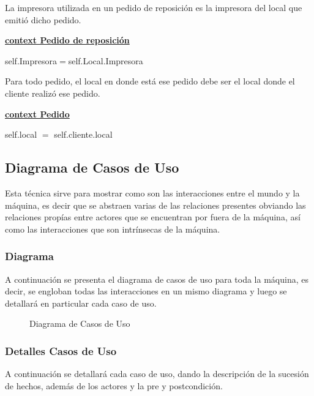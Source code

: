 \documentclass[a4paper,10pt]{article}
\begin{document}
\noindent La impresora utilizada en un pedido de reposición es la impresora del local que emitió dicho pedido.

\medskip

\underline{\textbf{context Pedido de reposición}}

self.Impresora$=$self.Local.Impresora

\bigskip

\noindent Para todo pedido, el local en donde est\'a ese pedido debe ser el local donde el cliente realiz\'o ese pedido.

\medskip

\underline{\textbf{context Pedido}}

self.local $=$ self.cliente.local

\newpage

\subsection*{Diagrama de Casos de Uso}

Esta t\'ecnica sirve para mostrar como son las interacciones entre el mundo y la m\'aquina, es decir que se abstraen varias de las relaciones presentes
obviando las relaciones prop\'ias entre actores que se encuentran por fuera de la m\'aquina, as\'i como las interacciones que son intr\'insecas de la m\'aquina.

\subsubsection*{Diagrama}

A continuaci\'on se presenta el diagrama de casos de uso para toda la m\'aquina, es decir, se engloban todas las interacciones en un mismo diagrama
y luego se detallar\'a en particular cada caso de uso.


\begin{figure}[H]
\centering
{}
\caption{Diagrama de Casos de Uso}
\end{figure}


\subsubsection*{Detalles Casos de Uso}

A continuaci\'on se detallar\'a cada caso de uso, dando la descripci\'on de la sucesi\'on de hechos, adem\'as de los actores y la pre y postcondici\'on.
\end{document}
